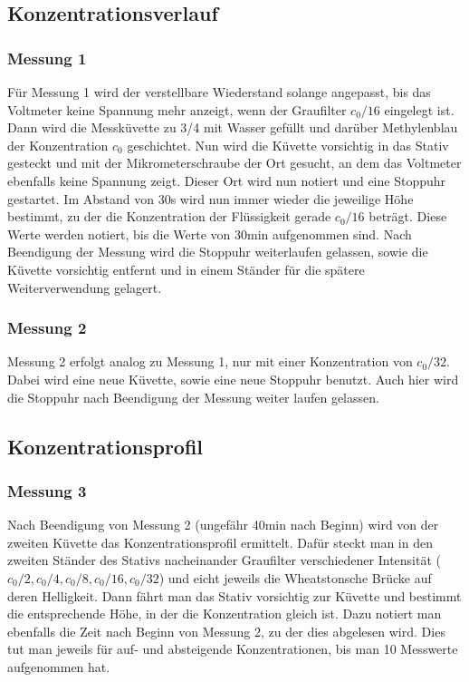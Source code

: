 \documentclass[12pt,a4paper,titlepage,headinclude,bibtotoc]{scrartcl}
\begin{document}
\subsection{Konzentrationsverlauf}
\subsubsection*{Messung 1}
\label{sec:messung1}
Für Messung 1 wird der verstellbare Wiederstand solange angepasst, bis das Voltmeter keine Spannung mehr anzeigt, wenn der Graufilter $c_0/16$ eingelegt ist.
Dann wird die Messküvette zu 3/4 mit Wasser gefüllt und darüber Methylenblau der Konzentration $c_0$ geschichtet.
Nun wird die Küvette vorsichtig in das Stativ gesteckt und mit der Mikrometerschraube der Ort gesucht, an dem das Voltmeter ebenfalls keine Spannung zeigt.
Dieser Ort wird nun notiert und eine Stoppuhr gestartet.
Im Abstand von 30s wird nun immer wieder die jeweilige Höhe bestimmt, zu der die Konzentration der Flüssigkeit gerade $c_0/16$ beträgt.
Diese Werte werden notiert, bis die Werte von 30min aufgenommen sind.
Nach Beendigung der Messung wird die Stoppuhr weiterlaufen gelassen, sowie die Küvette vorsichtig entfernt und in einem Ständer für die spätere Weiterverwendung gelagert.
\subsubsection*{Messung 2}
Messung 2 erfolgt analog zu Messung 1, nur mit einer Konzentration von $c_0/32$.
Dabei wird eine neue Küvette, sowie eine neue Stoppuhr benutzt.
Auch hier wird die Stoppuhr nach Beendigung der Messung weiter laufen gelassen.
\subsection{Konzentrationsprofil}
\subsubsection*{Messung 3}
Nach Beendigung von Messung 2 (ungefähr 40min nach Beginn) wird von der zweiten Küvette das Konzentrationsprofil ermittelt.
Dafür steckt man in den zweiten Ständer des Stativs nacheinander Graufilter verschiedener Intensität ($c_0/2, c_0/4, c_0/8, c_0/16, c_0/32$) und eicht jeweils die Wheatstonsche Brücke auf deren Helligkeit.
Dann fährt man das Stativ vorsichtig zur Küvette und bestimmt die entsprechende Höhe, in der die Konzentration gleich ist.
Dazu notiert man ebenfalls die Zeit nach Beginn von Messung 2, zu der dies abgelesen wird.
Dies tut man jeweils für auf- und absteigende Konzentrationen, bis man 10 Messwerte aufgenommen hat.
\end{document}
